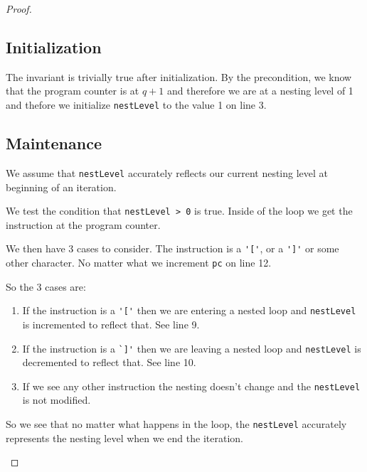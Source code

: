 \documentclass[10pt]{article}
\newcommand{\inl}{\lstinline[breaklines=true]}
\begin{document}
\begin{proof}
\subsection*{Initialization}
The invariant is trivially true after initialization. By the precondition,
we know that the program counter is at $q + 1$ and therefore we are at a
nesting level of 1 and thefore we initialize \inl!nestLevel! to the value 1
on line 3.

\subsection*{Maintenance}
We assume that \inl!nestLevel! accurately
reflects our current nesting level at beginning of an iteration.

We test the condition that \inl!nestLevel > 0! is true. Inside of the loop
we get the instruction at the program counter.

We then have 3 cases to consider. The instruction is a \inl!'['!, or a
\inl!']'! or some other character. No matter what we increment \inl!pc!  on
line 12.

So the 3 cases are:

\begin{enumerate}
\item If the instruction is a \inl!'['! then we are entering a nested loop and
\inl!nestLevel! is incremented to reflect that. See line 9. 

\item If the instruction is a \inl!`]'! then we are leaving a nested loop and
\inl!nestLevel! is decremented to reflect that. See line 10.

\item If we see any other instruction the nesting doesn't change and
the \inl!nestLevel! is not modified.
\end{enumerate}

So we see that no matter what happens in the loop, the \inl!nestLevel!
accurately represents the nesting level when we end the iteration.

\begin{center}
\end{center}


\end{proof}
\end{document}
